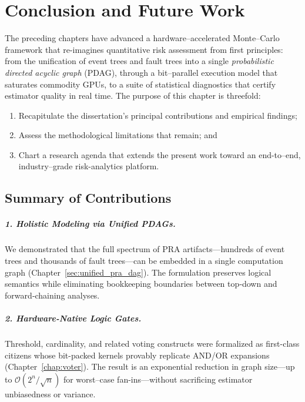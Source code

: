 \chapter{Conclusion and Future Work}
\label{chap:conclusion}

The preceding chapters have advanced a hardware--accelerated Monte--Carlo
framework that re-imagines quantitative risk assessment from first principles:
from the unification of event trees and fault trees into a single
\emph{probabilistic directed acyclic graph} (PDAG), through a
bit--parallel execution model that saturates commodity GPUs, to a suite of
statistical diagnostics that certify estimator quality in real time.  The
purpose of this chapter is threefold:
\begin{enumerate}
  \item Recapitulate the dissertation's principal contributions and empirical
        findings;
  \item Assess the methodological limitations that remain; and
  \item Chart a research agenda that extends the present work toward an
        end-to--end, industry--grade risk-analytics platform.
\end{enumerate}

\section{Summary of Contributions}
\label{sec:contrib_summary}

\paragraph*{1. Holistic Modeling via Unified PDAGs.}  We demonstrated that the
full spectrum of PRA artifacts—hundreds of event trees and thousands of fault
trees—can be embedded in a single computation graph (Chapter~\ref{sec:unified_pra_dag}).
The formulation preserves logical semantics while eliminating bookkeeping
boundaries between top‐down and forward‐chaining analyses.

\paragraph*{2. Hardware-Native Logic Gates.}  Threshold, cardinality,
and related voting constructs were formalized as first-class citizens whose
bit-packed kernels provably replicate AND/OR expansions
(Chapter~\ref{chap:voter}).  The result is an exponential reduction in graph
size—up to $\mathcal{O}(2^n/\!\sqrt{n})$ for worst–case fan-ins—without
sacrificing estimator unbiasedness or variance.

